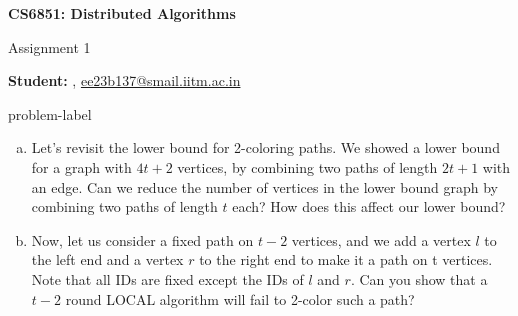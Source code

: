 


\usepackage{amssymb}
\usepackage{algpseudocode}



\begin{Large}
    \textsf{\textbf{CS6851: Distributed Algorithms}}
    
    Assignment 1
\end{Large}

\vspace{1ex}

\textsf{\textbf{Student:}} , \href{ee23b137@smail.iitm.ac.in}{ee23b137@smail.iitm.ac.in}\\

\begin{problem}{}{problem-label}
\begin{enumerate}[(a)]
    \item Let’s revisit the lower bound for 2-coloring paths. We showed a lower bound for a graph with
$4t+ 2$ vertices, by combining two paths of length $2t+ 1$ with an edge. Can we reduce the number
of vertices in the lower bound graph by combining two paths of length $t$ each? How does this
affect our lower bound?
    \item Now, let us consider a fixed path on $t- 2$ vertices, and we add a vertex $l$ to the left end and a
vertex $r$ to the right end to make it a path on t vertices. Note that all IDs are fixed except the
IDs of $l$ and $r$. Can you show that a $t- 2$ round LOCAL algorithm will fail to 2-color such a path?
\end{enumerate}
\end{problem}

